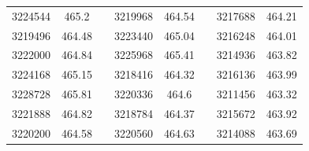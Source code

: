 \documentclass[12pt]{mwart}
\begin{document}
\begin{table}[H]
\begin{tabular}{cclcclcc}
		3224544                                                  & 465.2                                                         &  & 3219968                                                  & 464.54                                                        &  & 3217688                                                  & 464.21                                                        \\
		3219496                                                  & 464.48                                                        &  & 3223440                                                  & 465.04                                                        &  & 3216248                                                  & 464.01                                                        \\
		3222000                                                  & 464.84                                                        &  & 3225968                                                  & 465.41                                                        &  & 3214936                                                  & 463.82                                                        \\
		3224168                                                  & 465.15                                                        &  & 3218416                                                  & 464.32                                                        &  & 3216136                                                  & 463.99                                                        \\
		3228728                                                  & 465.81                                                        &  & 3220336                                                  & 464.6                                                         &  & 3211456                                                  & 463.32                                                        \\
		3221888                                                  & 464.82                                                        &  & 3218784                                                  & 464.37                                                        &  & 3215672                                                  & 463.92                                                        \\
		3220200                                                  & 464.58                                                        &  & 3220560                                                  & 464.63                                                        &  & 3214088                                                  & 463.69                                                        \\

\end{tabular}
\end{table}
\end{document}
